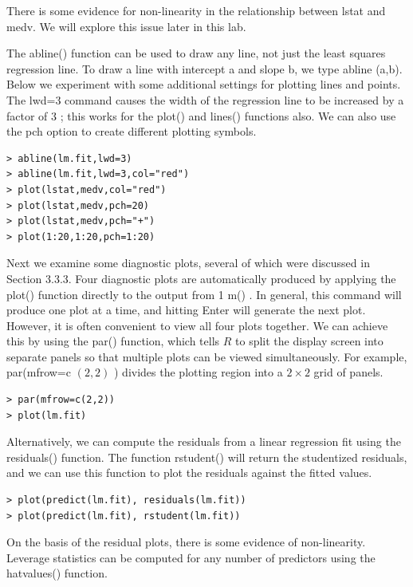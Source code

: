 \documentclass[10pt]{article}
\begin{document}
There is some evidence for non-linearity in the relationship between lstat and medv. We will explore this issue later in this lab.

The abline() function can be used to draw any line, not just the least squares regression line. To draw a line with intercept a and slope b, we type abline (a,b). Below we experiment with some additional settings for plotting lines and points. The lwd=3 command causes the width of the regression line to be increased by a factor of 3 ; this works for the plot() and lines() functions also. We can also use the pch option to create different plotting symbols.

\begin{verbatim}
> abline(lm.fit,lwd=3)
> abline(lm.fit,lwd=3,col="red")
> plot(lstat,medv,col="red")
> plot(lstat,medv,pch=20)
> plot(lstat,medv,pch="+")
> plot(1:20,1:20,pch=1:20)
\end{verbatim}

Next we examine some diagnostic plots, several of which were discussed in Section 3.3.3. Four diagnostic plots are automatically produced by applying the plot() function directly to the output from 1 m() . In general, this command will produce one plot at a time, and hitting Enter will generate the next plot. However, it is often convenient to view all four plots together. We can achieve this by using the par() function, which tells $R$ to split the display screen into separate panels so that multiple plots can be viewed simultaneously. For example, par(mfrow=c $(2,2)$ ) divides the plotting region into a $2 \times 2$ grid of panels.

\begin{verbatim}
> par(mfrow=c(2,2))
> plot(lm.fit)
\end{verbatim}

Alternatively, we can compute the residuals from a linear regression fit using the residuals() function. The function rstudent() will return the studentized residuals, and we can use this function to plot the residuals against the fitted values.

\begin{verbatim}
> plot(predict(lm.fit), residuals(lm.fit))
> plot(predict(lm.fit), rstudent(lm.fit))
\end{verbatim}

On the basis of the residual plots, there is some evidence of non-linearity. Leverage statistics can be computed for any number of predictors using the hatvalues() function.
\end{document}
